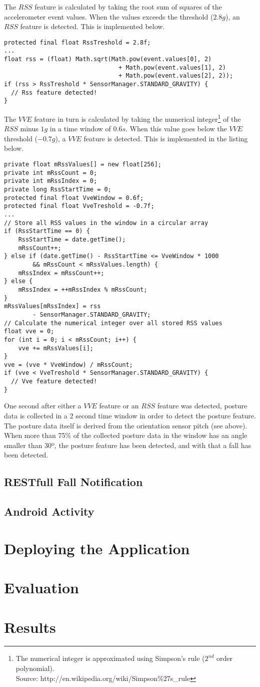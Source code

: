 \documentclass[a4paper, 10pt]{article}
\begin{document}
The $RSS$ feature is calculated by taking the root sum of squares of the accelerometer event values. When the values exceeds the threshold ($2.8g$), an $RSS$ feature is detected. This is implemented below.
\begin{lstlisting}
protected final float RssTreshold = 2.8f;
...
float rss = (float) Math.sqrt(Math.pow(event.values[0], 2)
                        		+ Math.pow(event.values[1], 2)
                        		+ Math.pow(event.values[2], 2));
if (rss > RssTreshold * SensorManager.STANDARD_GRAVITY) {  
  // Rss feature detected!
}
\end{lstlisting}
The $VVE$ feature in turn is calculated by taking the numerical integer\footnote{The numerical integer is approximated using Simpson's rule ($2^{nd}$ order polynomial).\\Source: http://en.wikipedia.org/wiki/Simpson\%27s\_rule} of the $RSS$ minus $1g$ in a time window of $0.6s$. When this value goes below the $VVE$ threshold ($-0.7g$), a $VVE$ feature is detected. This is implemented in the listing below.
\begin{lstlisting}
private float mRssValues[] = new float[256];
private int mRssCount = 0;
private int mRssIndex = 0;
private long RssStartTime = 0;
protected final float VveWindow = 0.6f;
protected final float VveTreshold = -0.7f;
...
// Store all RSS values in the window in a circular array
if (RssStartTime == 0) {
	RssStartTime = date.getTime();
	mRssCount++;
} else if (date.getTime() - RssStartTime <= VveWindow * 1000
		&& mRssCount < mRssValues.length) {
	mRssIndex = mRssCount++;
} else {
	mRssIndex = ++mRssIndex % mRssCount;
}
mRssValues[mRssIndex] = rss
		- SensorManager.STANDARD_GRAVITY;
// Calculate the numerical integer over all stored RSS values
float vve = 0;
for (int i = 0; i < mRssCount; i++) {
	vve += mRssValues[i];
}
vve = (vve * VveWindow) / mRssCount;
if (vve < VveTreshold * SensorManager.STANDARD_GRAVITY) {
  // Vve feature detected!
}
\end{lstlisting}
One second after either a $VVE$ feature or an $RSS$ feature was detected, posture data is collected in a 2 second time window in order to detect the posture feature. The posture data itself is derived from the orientation sensor pitch (see above). When more than 75\% of the collected posture data in the window has an angle smaller than 30º, the posture feature has been detected, and with that a fall has been detected.


\subsection{RESTfull Fall Notification}

\subsection{Android Activity}

\section{Deploying the Application}

\section{Evaluation}
\section{Results}
\end{document}
